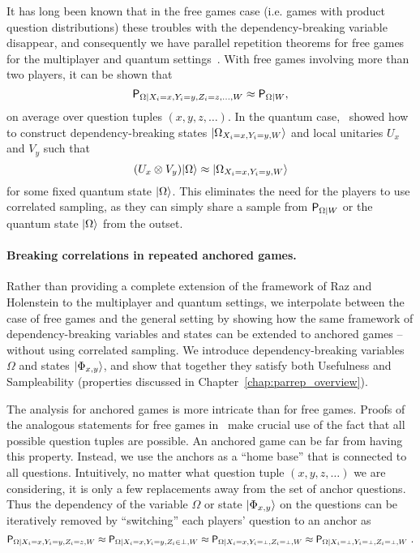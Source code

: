 It has long been known that in the free games case (i.e. games with product question distributions) these troubles with the dependency-breaking variable disappear, and consequently we have parallel repetition theorems for free games for the multiplayer and quantum settings~\cite{chung2015parallel}. With free games involving more than two players, it can be shown that 
\begin{equation}
\P_{\Omega | X_i = x,Y_i = y,Z_i = z,\ldots,W} \approx \P_{\Omega | W},
\label{eq:intro_free_multiplayer}
\end{equation}
on average over question tuples $(x,y,z,\ldots)$. In the quantum case,~\cite{JainPY14,ChaillouxS14,chung2015parallel} showed how to construct dependency-breaking states $\ket{\Omega_{X_i = x,Y_i = y,W}}$ and local unitaries $U_x$ and $V_y$ such that 
\begin{equation}
	(U_x \otimes V_y) \ket{\Omega} \approx \ket{\Omega_{X_i = x,Y_i = y,W}}
	\label{eq:intro_free_quantum}
\end{equation}
for some fixed quantum state $\ket{\Omega}$. This eliminates the need for the players to use correlated sampling, as they can simply share a sample from $\P_{\Omega |W}$ or the quantum state $\ket{\Omega}$ from the outset. 

\paragraph{Breaking correlations in repeated anchored games.} Rather than providing a complete extension of the framework of Raz and Holenstein to the multiplayer and quantum settings, we interpolate between the case of free games and the general setting by showing how the same framework of dependency-breaking variables and states can be extended to anchored games -- without using correlated sampling. We introduce dependency-breaking variables $\Omega$ and states $\ket{\Phi_{x,y}}$, and show that together they satisfy both Usefulness and Sampleability (properties discussed in Chapter~\ref{chap:parrep_overview}).

The analysis for anchored games is more intricate than for free games. Proofs of the analogous statements for free games in~\cite{jain2013parallel,  chailloux2014parallel, chung2015parallel} make crucial use of the fact that all possible question tuples are possible. An anchored game can be far from having this property. Instead, we use the anchors as a ``home base'' that is connected to all questions. Intuitively, no matter what question tuple $(x,y,z,\ldots)$ we are considering, it is only a few replacements away from the set of anchor questions. Thus the dependency of the variable $\Omega$ or state $\ket{\Phi_{x,y}}$ on the questions can be iteratively removed by ``switching'' each players' question to an anchor as
$$
	\P_{\Omega | X_i = x,Y_i = y,Z_i = z,W} \approx \P_{\Omega | X_i = x,Y_i = y,Z_i \in \perp,W} \approx \P_{\Omega | X_i = x,Y_i = \dummy,Z_i = \dummy,W} \approx \P_{\Omega | X_i = \dummy,Y_i = \dummy,Z_i = \dummy,W}~.
$$

